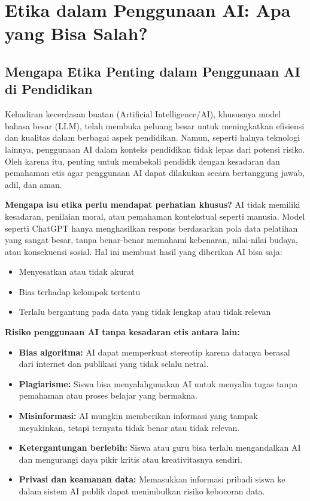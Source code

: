 \chapter{Etika dalam Penggunaan AI: Apa yang Bisa Salah?}

\section{Mengapa Etika Penting dalam Penggunaan AI di Pendidikan}

Kehadiran kecerdasan buatan (Artificial Intelligence/AI), khususnya model bahasa besar (LLM), telah membuka peluang besar untuk meningkatkan efisiensi dan kualitas dalam berbagai aspek pendidikan. Namun, seperti halnya teknologi lainnya, penggunaan AI dalam konteks pendidikan tidak lepas dari potensi risiko. Oleh karena itu, penting untuk membekali pendidik dengan kesadaran dan pemahaman etis agar penggunaan AI dapat dilakukan secara bertanggung jawab, adil, dan aman.

\textbf{Mengapa isu etika perlu mendapat perhatian khusus?}  
AI tidak memiliki kesadaran, penilaian moral, atau pemahaman kontekstual seperti manusia. Model seperti ChatGPT hanya menghasilkan respons berdasarkan pola data pelatihan yang sangat besar, tanpa benar-benar memahami kebenaran, nilai-nilai budaya, atau konsekuensi sosial. Hal ini membuat hasil yang diberikan AI bisa saja:
\begin{itemize}
	\item Menyesatkan atau tidak akurat
	\item Bias terhadap kelompok tertentu
	\item Terlalu bergantung pada data yang tidak lengkap atau tidak relevan
\end{itemize}

\textbf{Risiko penggunaan AI tanpa kesadaran etis antara lain:}
\begin{itemize}
	\item \textbf{Bias algoritma:} AI dapat memperkuat stereotip karena datanya berasal dari internet dan publikasi yang tidak selalu netral.
	\item \textbf{Plagiarisme:} Siswa bisa menyalahgunakan AI untuk menyalin tugas tanpa pemahaman atau proses belajar yang bermakna.
	\item \textbf{Misinformasi:} AI mungkin memberikan informasi yang tampak meyakinkan, tetapi ternyata tidak benar atau tidak relevan.
	\item \textbf{Ketergantungan berlebih:} Siswa atau guru bisa terlalu mengandalkan AI dan mengurangi daya pikir kritis atau kreativitasnya sendiri.
	\item \textbf{Privasi dan keamanan data:} Memasukkan informasi pribadi siswa ke dalam sistem AI publik dapat menimbulkan risiko kebocoran data.
\end{itemize}

